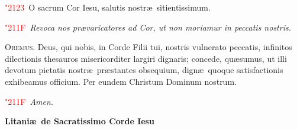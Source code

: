 \documentclass[12pt]{article}\errorcontextlines=9
\newcommand\centerheading[1]{%
\begin{center}
\normalsize\textbf{#1}\\%
\end{center}
}
\newcommand\versic[1]{%
\textcolor{red}{\char"2123\ }#1%
}
\newcommand\response[1]{%
\textcolor{red}{\char"211F\ }#1%
}
\begin{document}
\begin{multicols}{2}
\versic O sacrum Cor Iesu, salutis nostr\ae\ sitientissimum.

\response \textit{Revoca nos pr\ae varicatores ad Cor, ut non moriamur in peccatis nostris.}

\bigskip

\lettrine{O}{\color{red}remus}. Deus, qui nobis, in Corde Filii tui, nostris vulnerato peccatis, infinitos dilectionis thesauros misericorditer largiri dignaris; concede, qu\ae sumus, ut illi devotum pietatis nostr\ae\ pr\ae stantes obsequium, dign\ae\ quoque satisfactionis exhibeamus officium. Per eundem Christum Dominum nostrum.

\response \textit{Amen.}

\end{multicols}

\newpage


\centerheading{\LARGE{\color{red}Litani\ae\ de Sacratissimo Corde Iesu}}

\bigskip
\end{document}
